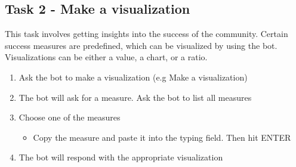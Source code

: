 \subsection*{Task 2 - Make a visualization}
This task involves getting insights into the success of the community. Certain success measures are predefined, which can be visualized by using the bot. Visualizations can be either a value, a chart, or a ratio.
\begin{enumerate}
    \item Ask the bot to make a visualization (e.g Make a visualization)
    \item The bot will ask for a measure. Ask the bot to list all measures
    \item Choose one of the measures 
    \begin{itemize}
        \item Copy the measure and paste it into the typing field. Then hit ENTER
    \end{itemize}
    \item The bot will respond with the appropriate visualization
    
\end{enumerate}


